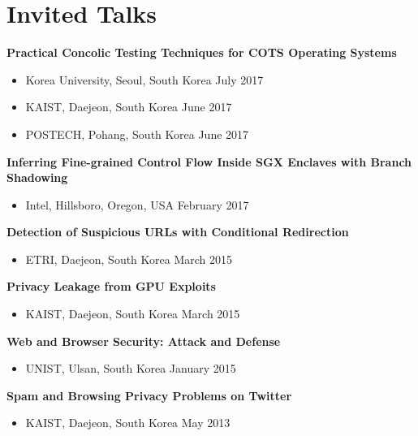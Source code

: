 \section*{Invited Talks}
\begin{description}
    \item \textbf{Practical Concolic Testing Techniques for COTS Operating Systems}
      \begin{itemize}
         \item Korea University, Seoul, South Korea \dotfill July 2017
         \item KAIST, Daejeon, South Korea \dotfill June 2017
         \item POSTECH, Pohang, South Korea \dotfill June 2017
      \end{itemize}

    \item \textbf{Inferring Fine-grained Control Flow Inside SGX Enclaves with Branch Shadowing}
      \begin{itemize}
          \item Intel, Hillsboro, Oregon, USA \dotfill February 2017
      \end{itemize}

    \item \textbf{Detection of Suspicious URLs with Conditional Redirection}
      \begin{itemize}
          \item ETRI, Daejeon, South Korea \dotfill March 2015
      \end{itemize}
      
    \item \textbf{Privacy Leakage from GPU Exploits}
      \begin{itemize}
          \item KAIST, Daejeon, South Korea \dotfill March 2015
      \end{itemize}

    \item \textbf{Web and Browser Security: Attack and Defense}
      \begin{itemize}
          \item UNIST, Ulsan, South Korea \dotfill January 2015
      \end{itemize}

    \item \textbf{Spam and Browsing Privacy Problems on Twitter}
      \begin{itemize}
          \item KAIST, Daejeon, South Korea \dotfill May 2013
      \end{itemize}
      
\end{description}
